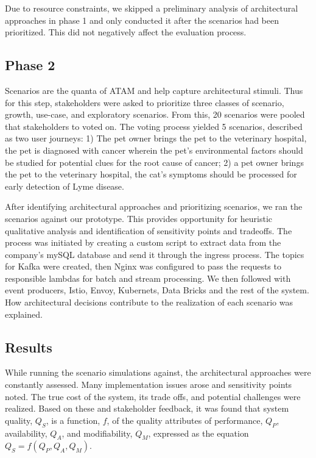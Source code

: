 \documentclass[a4paper,11pt]{article}
\begin{document}
Due to resource constraints, we skipped a preliminary analysis of architectural approaches in phase 1 and only conducted it after the scenarios had been prioritized. This did not negatively affect the evaluation process.



\subsection{Phase 2}
\nobreak{}
Scenarios are the quanta of ATAM and help capture architectural stimuli. Thus for this step, stakeholders were asked to prioritize three classes of scenario, growth, use-case, and exploratory scenarios. From this, 20 scenarios were pooled that stakeholders to voted on. The voting process yielded 5 scenarios, described as two user journeys: 1) The pet owner brings the pet to the veterinary hospital, the pet is diagnosed with cancer wherein the pet's environmental factors should be studied for potential clues for the root cause of cancer; 2) a pet owner brings the pet to the veterinary hospital, the cat's symptoms should be processed for early detection of Lyme disease. 

After identifying architectural approaches and prioritizing scenarios, we ran the scenarios against our prototype. This provides opportunity for heuristic qualitative analysis and identification of sensitivity points and tradeoffs. The process was initiated by creating a custom script to extract data from the company's mySQL database and send it through the ingress process. The topics for Kafka were created, then Nginx was configured to pass the requests to responsible lambdas for batch and stream processing. We then followed with event producers, Istio, Envoy, Kubernets, Data Bricks and the rest of the system. How architectural decisions contribute to the realization of each scenario was explained.

\subsection{Results}
\nobreak{}
While running the scenario simulations against, the architectural approaches were constantly assessed. Many implementation issues arose and sensitivity points noted. The true cost of the system, its trade offs, and potential challenges were realized. Based on these and stakeholder feedback, it was found that system quality, $Q_S$, is a function, $f$, of the quality attributes of performance, $Q_P$, availability, $Q_A$, and modifiability, $Q_M$, expressed as the equation $Q_S = f(Q_P, Q_A, Q_M)$.
\end{document}

